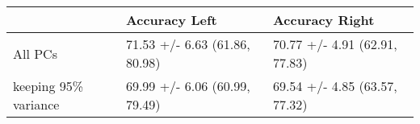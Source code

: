 \begin{tabular}{lll}
\toprule
{} &                  Accuracy Left &                 Accuracy Right \\
\midrule
All PCs              &  71.53 +/- 6.63 (61.86, 80.98) &  70.77 +/- 4.91 (62.91, 77.83) \\
keeping 95\% variance &  69.99 +/- 6.06 (60.99, 79.49) &  69.54 +/- 4.85 (63.57, 77.32) \\
\bottomrule
\end{tabular}
